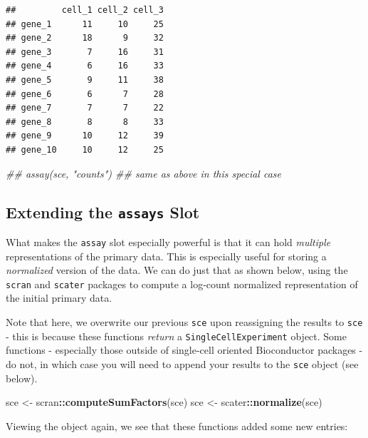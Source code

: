 \documentclass[]{book}
\newenvironment{Shaded}{\begin{snugshade}}{\end{snugshade}}
\newcommand{\CommentTok}[1]{\textcolor[rgb]{0.56,0.35,0.01}{\textit{#1}}}
\newcommand{\KeywordTok}[1]{\textcolor[rgb]{0.13,0.29,0.53}{\textbf{#1}}}
\newcommand{\NormalTok}[1]{#1}
\newcommand{\OperatorTok}[1]{\textcolor[rgb]{0.81,0.36,0.00}{\textbf{#1}}}
\newcommand{\StringTok}[1]{\textcolor[rgb]{0.31,0.60,0.02}{#1}}
\begin{document}
\begin{verbatim}
##         cell_1 cell_2 cell_3
## gene_1      11     10     25
## gene_2      18      9     32
## gene_3       7     16     31
## gene_4       6     16     33
## gene_5       9     11     38
## gene_6       6      7     28
## gene_7       7      7     22
## gene_8       8      8     33
## gene_9      10     12     39
## gene_10     10     12     25
\end{verbatim}

\begin{Shaded}
\begin{Highlighting}[]
\CommentTok{## assay(sce, "counts") ## same as above in this special case}
\end{Highlighting}
\end{Shaded}

\hypertarget{extending-the-assays-slot}{%
\subsection{\texorpdfstring{Extending the \texttt{assays} Slot}{Extending the assays Slot}}\label{extending-the-assays-slot}}

What makes the \texttt{assay} slot especially powerful is that it can hold \emph{multiple} representations of the primary data. This is especially useful for storing a \emph{normalized} version of the data. We can do just that as shown below, using the \texttt{scran} and \texttt{scater} packages to compute a log-count normalized representation of the initial primary data.

Note that here, we overwrite our previous \texttt{sce} upon reassigning the results to \texttt{sce} - this is because these functions \emph{return} a \texttt{SingleCellExperiment} object. Some functions - especially those outside of single-cell oriented Bioconductor packages - do not, in which case you will need to append your results to the \texttt{sce} object (see below).

\begin{Shaded}
\begin{Highlighting}[]
\NormalTok{sce <-}\StringTok{ }\NormalTok{scran}\OperatorTok{::}\KeywordTok{computeSumFactors}\NormalTok{(sce)}
\NormalTok{sce <-}\StringTok{ }\NormalTok{scater}\OperatorTok{::}\KeywordTok{normalize}\NormalTok{(sce)}
\end{Highlighting}
\end{Shaded}

Viewing the object again, we see that these functions added some new entries:
\end{document}
